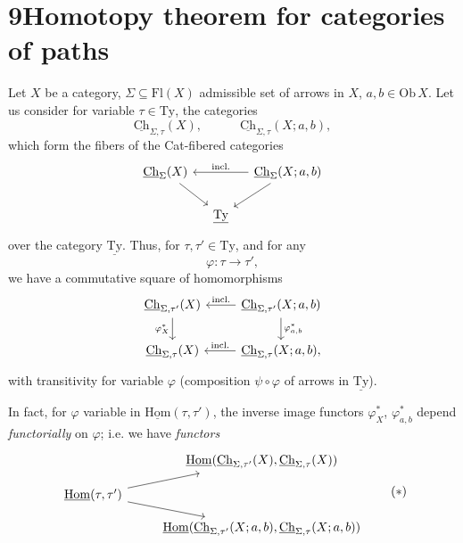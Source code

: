 \documentclass[11pt]{article}
\newcommand{\printedpage}[1]{\marginpar{\footnotesize p.~#1}}
\newcommand{\msp}[1]{\marginpar{\footnotesize [#1]}}
\newcommand{\uHom}{\underline{\mathrm{Hom}}}
\newcommand{\uCh}{\underline{\mathrm{Ch}}}
\newcommand{\uTy}{\underline{\mathrm{Ty}}}
\begin{document}
\msp{page 94}

\section*{9\quad Homotopy theorem for categories of paths}

Let $X$ be a category, $\Sigma\subseteq\mathrm{Fl}(X)$ admissible set of arrows in $X$, $a,b\in\mathrm{Ob}\,X$. Let us consider for variable $\tau\in\mathrm{Ty}$, the categories
\[
\uCh_{\Sigma,\tau}(X),\qquad\quad\uCh_{\Sigma,\tau}(X;a,b),
\]
which form the fibers of the Cat-fibered categories
\[
\begin{tikzcd}[column sep=small]
\uCh_\Sigma(X) \arrow[dr] & & \uCh_\Sigma(X;a,b) \arrow[ll, "\text{incl.}"'] \arrow[dl]\\
 & \uTy &
\end{tikzcd}
\]
over the category $\uTy$. Thus, for $\tau,\tau'\in\mathrm{Ty}$, and for any
\[
\varphi:\tau\longrightarrow\tau',
\]
we have a commutative square of homomorphisms
\[
\begin{tikzcd}
\uCh_{\Sigma,\tau'}(X) \arrow[d, "\varphi^*_X"'] & \uCh_{\Sigma,\tau'}(X;a,b) \arrow[l, "\text{incl.}"'] \arrow[d, "\varphi^*_{a,b}"]\\
\uCh_{\Sigma,\tau}(X) & \uCh_{\Sigma,\tau}(X;a,b), \arrow[l, "\text{incl.}"']
\end{tikzcd}
\]
with transitivity for variable $\varphi$ (composition $\psi\circ\varphi$ of arrows in $\uTy$).

In fact, for $\varphi$ variable in $\uHom(\tau,\tau')$, the inverse image functors $\varphi^*_X$, $\varphi^*_{a,b}$ depend \textit{functorially} on $\varphi$; i.e. we have \textit{functors}
\[
\begin{tikzcd}[row sep=small]
 & \uHom(\uCh_{\Sigma,\tau'}(X),\uCh_{\Sigma,\tau}(X))\\
\uHom(\tau,\tau') \arrow[ur] \arrow[dr] & \\
 & \uHom(\uCh_{\Sigma,\tau'}(X;a,b),\uCh_{\Sigma,\tau}(X;a,b))
\end{tikzcd}
\tag*{$(*)$}
\]

\newpage
\printedpage{61}

\msp{page 95}
\end{document}
